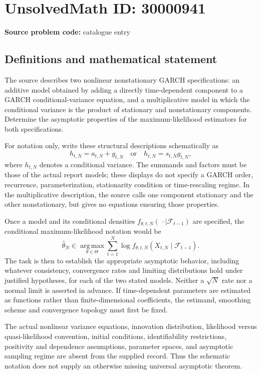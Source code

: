 \documentclass[11pt]{article}
\begin{document}
\section*{UnsolvedMath ID: 30000941}
\textbf{Source problem code:} catalogue entry
\subsection{Definitions and mathematical statement}
The source describes two nonlinear nonstationary GARCH specifications: an additive model obtained by adding a directly time-dependent component to a GARCH conditional-variance equation, and a multiplicative model in which the conditional variance is the product of stationary and nonstationary components. Determine the asymptotic properties of the maximum-likelihood estimators for both specifications.

For notation only, write these structural descriptions schematically as
\[
h_{t,N}=a_{t,N}+g_{t,N}
\quad\text{or}\quad
h_{t,N}=s_{t,N}g_{t,N},
\]
where $h_{t,N}$ denotes a conditional variance. The summands and factors must be those of the actual report models; these displays do not specify a GARCH order, recurrence, parameterization, stationarity condition or time-rescaling regime. In the multiplicative description, the source calls one component stationary and the other nonstationary, but gives no equations ensuring those properties.

Once a model and its conditional densities $f_{\theta,t,N}(\,\cdot\mid\mathcal F_{t-1})$ are specified, the conditional maximum-likelihood notation would be
\[
\widehat\theta_N\in\operatorname*{arg\,max}_{\theta\in\Theta}
\sum_{t=1}^{N}\log f_{\theta,t,N}(X_{t,N}\mid\mathcal F_{t-1}).
\]
The task is then to establish the appropriate asymptotic behavior, including whatever consistency, convergence rates and limiting distributions hold under justified hypotheses, for each of the two stated models. Neither a $\sqrt N$ rate nor a normal limit is asserted in advance. If time-dependent parameters are estimated as functions rather than finite-dimensional coefficients, the estimand, smoothing scheme and convergence topology must first be fixed.

The actual nonlinear variance equations, innovation distribution, likelihood versus quasi-likelihood convention, initial conditions, identifiability restrictions, positivity and dependence assumptions, parameter spaces, and asymptotic sampling regime are absent from the supplied record. Thus the schematic notation does not supply an otherwise missing universal asymptotic theorem.
\end{document}
